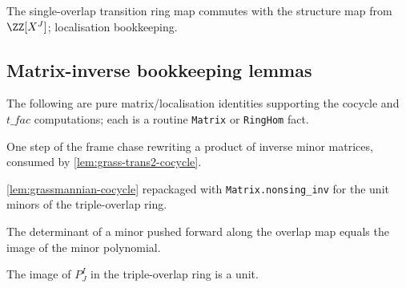 \begin{lemma}

  \label{lem:grass-trans-comp-algebramap}
  The single-overlap transition ring map commutes with the structure map from
  $\ZZ[X^J]$; localisation bookkeeping.
\end{lemma}

\subsection{Matrix-inverse bookkeeping lemmas}

The following are pure matrix/localisation identities supporting the cocycle and
$t\_fac$ computations; each is a routine \texttt{Matrix} or \texttt{RingHom} fact.

\begin{lemma}

  \label{lem:grass-trans-step}
  One step of the frame chase rewriting a product of inverse minor matrices,
  consumed by \cref{lem:grass-trans2-cocycle}.
\end{lemma}

\begin{lemma}

  \label{lem:cocycle-nonsing-inv}
  \cref{lem:grassmannian-cocycle} repackaged with \texttt{Matrix.nonsing\_inv} for
  the unit minors of the triple-overlap ring.
\end{lemma}

\begin{lemma}

  \label{lem:grass-pushed-minor-det}
  The determinant of a minor pushed forward along the overlap map equals the image
  of the minor polynomial.
\end{lemma}

\begin{lemma}

  \label{lem:grass-minor-algebramap-isunit-left}
  The image of $P^I_J$ in the triple-overlap ring is a unit.
\end{lemma}

